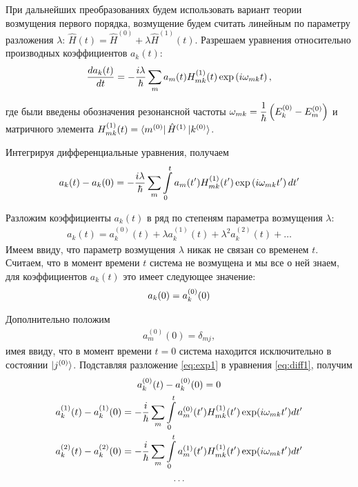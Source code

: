 При дальнейших преобразованиях будем использовать вариант теории возмущения первого порядка, возмущение будем считать линейным по параметру разложения $\lambda$: $\hat{H}(t) = \hat{H}^{(0)} + \lambda \hat{H}^{(1)}(t)$. Разрешаем уравнения относительно производных коэффициентов $a_k(t)$:
\vverh
\begin{gather}
	\frac{d a_k(t)}{dt} = - \frac{i \lambda}{\hbar} \sum_m a_m(t) H_{mk}^{(1)}(t) \exp \left( i \omega_{mk} t \right) , \notag
\end{gather}

\vverh где были введены обозначения резонансной частоты $\omega_{mk} = \displaystyle \frac{1}{\hbar} \left( E_k^{(0)} - E_m^{(0)} \right)$ и матричного элемента $H_{mk}^{(1)}(t) = \bra{m^{(0)}} \hat{H}^{(1)} \ket{k^{(0)}}$.

Интегрируя дифференциальные уравнения, получаем
\vverh
\begin{gather}
	a_k(t) - a_k(0) = - \frac{i \lambda}{\hbar} \sum_m \int\limits_0^t a_m(t^\prime) H_{mk}^{(1)} (t^\prime) \exp \left( i \omega_{mk} t^\prime \right) d t^\prime \label{eq:diff1}
\end{gather}

Разложим коэффициенты $a_k(t)$ в ряд по степеням параметра возмущения $\lambda$:
\vverh
\begin{gather}
	a_k(t) = a_k^{(0)}(t) + \lambda a_k^{(1)}(t) + \lambda^2 a_k^{(2)}(t) + \dots \label{eq:exp1}
\end{gather}
Имеем ввиду, что параметр возмущения $\lambda$ никак не связан со временем $t$. Считаем, что в момент времени $t$ система не возмущена и мы все о ней знаем, для коэффициентов $a_k(t)$ это имеет следующее значение:
\vverh
\begin{gather}
	a_k(0) = a_k^{(0)}(0) \notag 
\end{gather}

Дополнительно положим 
\vverh
\begin{gather}
	a_m^{(0)}(0) = \delta_{mj}, \label{eq:exp2}
\end{gather}
имея ввиду, что в момент времени $t = 0$ система находится исключительно в состоянии $\ket{j^{(0)}}$. Подставляя разложение \ref{eq:exp1} в уравнения \ref{eq:diff1}, получим
\vverh
\begin{gather}
	a_k^{(0)}(t) - a_k^{(0)}(0) = 0 \notag \\
	a_k^{(1)}(t) - a_k^{(1)}(0) = - \frac{i}{\hbar} \sum_m \int\limits_0^t a_m^{(0)}(t^\prime) H_{mk}^{(1)} (t^\prime) \exp (i \omega_{mk} t^\prime) dt^\prime \notag \\
	a_k^{(2)}(t) - a_k^{(2)}(0) = - \frac{i}{\hbar} \sum_m \int\limits_0^t a_m^{(1)} (t^\prime) H_{mk}^{(1)} (t^\prime) \exp (i \omega_{mk} t^\prime) d t^\prime \notag \\
 \dots \notag 
\end{gather}

